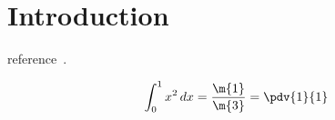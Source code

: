 \section{Introduction}

\blindtext
reference~\cite{Reynolds1}.


\[
    \int_0^1 x^2 \, dx = \frac{\m{1}}{\m{3}} = \pdv{1}{1}
\]
